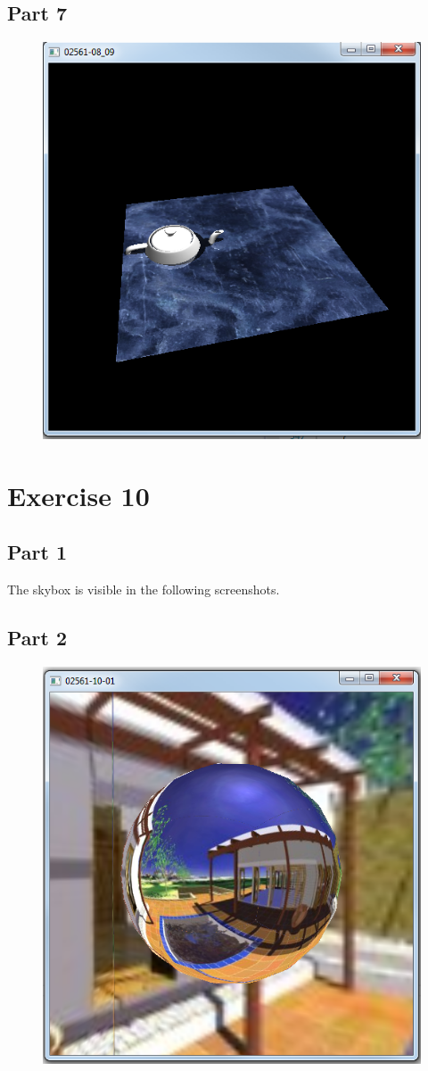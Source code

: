 \documentclass[11pt]{article}
\begin{document}
\subsection{Part 7}
\begin{figure}[H]
	\centering
	\includegraphics[width=0.5\linewidth]{images/e09p7}
	\label{fig:e09p7}
\end{figure}


\section{Exercise 10}
\subsection{Part 1}
The skybox is visible in the following screenshots.

\subsection{Part 2}
\begin{figure}[H]
	\centering
	\includegraphics[width=0.5\linewidth]{images/e10p2}
	\label{fig:e10p2}
\end{figure}
\end{document}
